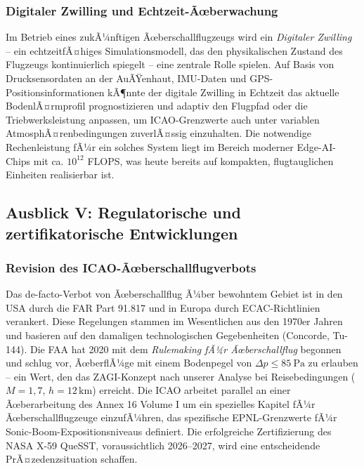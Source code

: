 ﻿\documentclass[12pt,a4paper]{article}
\theoremstyle{definition}
\theoremstyle{remark}
\begin{document}
\subsubsection{Digitaler Zwilling und Echtzeit-Ãœberwachung}

Im Betrieb eines zukÃ¼nftigen Ãœberschallflugzeugs wird ein \emph{Digitaler Zwilling} --
ein echtzeitfÃ¤higes Simulationsmodell, das den physikalischen Zustand des Flugzeugs
kontinuierlich spiegelt -- eine zentrale Rolle spielen. Auf Basis von Drucksensordaten
an der AuÃŸenhaut, IMU-Daten und GPS-Positionsinformationen kÃ¶nnte der digitale Zwilling
in Echtzeit das aktuelle BodenlÃ¤rmprofil prognostizieren und adaptiv den Flugpfad oder
die Triebwerksleistung anpassen, um ICAO-Grenzwerte auch unter variablen AtmosphÃ¤renbedingungen
zuverlÃ¤ssig einzuhalten. Die notwendige Rechenleistung fÃ¼r ein solches System liegt im Bereich
moderner Edge-AI-Chips mit ca. $10^{12}$ FLOPS, was heute bereits auf kompakten,
flugtauglichen Einheiten realisierbar ist.

\subsection{Ausblick V: Regulatorische und zertifikatorische Entwicklungen}
\label{sec:ausblick_regulierung}

\subsubsection{Revision des ICAO-Ãœberschallflugverbots}

Das de-facto-Verbot von Ãœberschallflug Ã¼ber bewohntem Gebiet ist in den USA durch die
FAR Part 91.817 und in Europa durch ECAC-Richtlinien verankert. Diese Regelungen stammen
im Wesentlichen aus den 1970er Jahren und basieren auf den damaligen technologischen
Gegebenheiten (Concorde, Tu-144). Die FAA hat 2020 mit dem \emph{Rulemaking fÃ¼r
Ãœberschallflug} begonnen und schlug vor, ÃœberflÃ¼ge mit einem Bodenpegel von
$\Delta p \le \SI{85}{\pascal}$ zu erlauben -- ein Wert, den das ZAGI-Konzept
nach unserer Analyse bei Reisebedingungen ($M = 1{,}7$, $h = 12\,\text{km}$) erreicht.
Die ICAO arbeitet parallel an einer Ãœberarbeitung des Annex 16 Volume I um ein
spezielles Kapitel fÃ¼r Ãœberschallflugzeuge einzufÃ¼hren, das spezifische
EPNL-Grenzwerte fÃ¼r Sonic-Boom-Expositionsniveaus definiert. Die erfolgreiche
Zertifizierung des NASA X-59 QueSST, voraussichtlich 2026--2027, wird eine
entscheidende PrÃ¤zedenzsituation schaffen.
\end{document}
